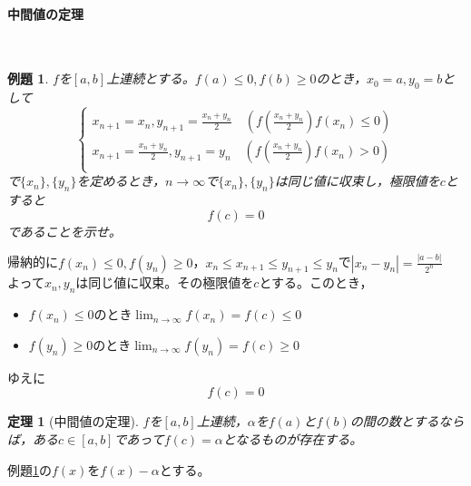 \documentclass[dvipdfmx,a4j,10pt]{jsarticle}
\makeatletter
\theoremstyle{mystyle1}
\newtheorem{thm}[dfn]{定理}
\newtheorem{ex}[dfn]{例題}
\theoremstyle{mystyle2}
\newtheorem{ans}{解答}
\renewenvironment{proof}[1][\proofname]{\par
  \pushQED{\qed}%
  \normalfont
  \topsep6\p@\@plus6\p@ \trivlist
  \item[\hskip\labelsep{\bfseries\sffamily #1}]\ignorespaces
}{%
  \popQED\endtrivlist\@endpefalse
}
\renewcommand\proofname{証明}
\renewenvironment{ans}[1][解答]{\par
  \pushQED{\qed}%
  \normalfont
  \topsep6\p@\@plus6\p@ \trivlist
  \item[\hskip\labelsep{\bfseries\sffamily #1}]\ignorespaces
}{%
  \popQED\endtrivlist\@endpefalse
}
\makeatother
\begin{document}
\newpage

\paragraph{中間値の定理}
　
\begin{shaded}
    \begin{ex}\label{ex5.8}
        $f$を$[a,b]$上連続とする。$f(a)\leq 0,f(b)\geq0$のとき，$x_0=a,y_0=b$として
        \[
        \begin{cases*}
        \displaystyle x_{n+1}=x_n,y_{n+1}=\frac{x_n+y_n}{2} \quad \left(f\left(\frac{x_n+y_n}{2}\right)f(x_n)\leq0\right)\\
        \displaystyle x_{n+1}=\frac{x_n+y_n}{2},y_{n+1}=y_n \quad \left(f\left(\frac{x_n+y_n}{2}\right)f(x_n)>0\right)\\
        \end{cases*}
        \]
        で$\{x_n\},\{y_n\}$を定めるとき，$n\to\infty$で$\{x_n\},\{y_n\}$は同じ値に収束し，極限値を$c$とすると
        \[
        f(c)=0
        \]
        であることを示せ。
    \end{ex}
\end{shaded}

\begin{ans}[解答\ref{ex5.8}]
    帰納的に$f(x_n)\leq0,f(y_n)\geq0$，$x_n\leq x_{n+1}\leq y_{n+1}\leq y_n$で$\displaystyle |x_n-y_n|=\frac{|a-b|}{2^n}$\\
    よって$x_n,y_n$は同じ値に収束。その極限値を$c$とする。このとき，
    \begin{itemize}
    \item $f(x_n)\leq 0$のとき$\displaystyle\lim_{n\to\infty}f(x_n)=f(c)\leq 0$
    \item $f(y_n)\geq 0$のとき$\displaystyle\lim_{n\to\infty}f(y_n)=f(c)\geq 0$
    \end{itemize}
    ゆえに
    \[
    f(c)=0
    \]
\end{ans}

\begin{framed}
    \begin{thm}[中間値の定理]\label{thm5.9}
    $f$を$[a,b]$上連続，$\alpha$を$f(a)$と$f(b)$の間の数とするならば，ある$c\in [a,b]$であって$f(c)=\alpha$となるものが存在する。\footnotemark
    \end{thm}
\end{framed}

\begin{proof}[定理\ref{thm5.9}の証明]
    例題\ref{ex5.8}の$f(x)$を$f(x)-\alpha$とする。
\end{proof}
\end{document}
